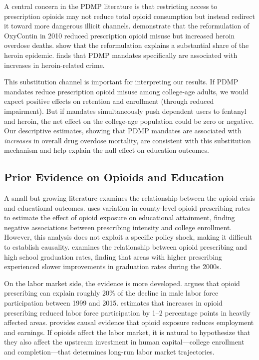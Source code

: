 \documentclass[12pt]{article}
\begin{document}
A central concern in the PDMP literature is that restricting access to prescription opioids may not reduce total opioid consumption but instead redirect it toward more dangerous illicit channels. \citet{alpert2018supply} demonstrate that the reformulation of OxyContin in 2010 reduced prescription opioid misuse but increased heroin overdose deaths. \citet{evans2019opioid} show that the reformulation explains a substantial share of the heroin epidemic. \citet{mallatt2022effect} finds that PDMP mandates specifically are associated with increases in heroin-related crime.

This substitution channel is important for interpreting our results. If PDMP mandates reduce prescription opioid misuse among college-age adults, we would expect positive effects on retention and enrollment (through reduced impairment). But if mandates simultaneously push dependent users to fentanyl and heroin, the net effect on the college-age population could be zero or negative. Our descriptive estimates, showing that PDMP mandates are associated with \textit{increases} in overall drug overdose mortality, are consistent with this substitution mechanism and help explain the null effect on education outcomes.

\subsection{Prior Evidence on Opioids and Education}

A small but growing literature examines the relationship between the opioid crisis and educational outcomes. \citet{zuo2022opioids} uses variation in county-level opioid prescribing rates to estimate the effect of opioid exposure on educational attainment, finding negative associations between prescribing intensity and college enrollment. However, this analysis does not exploit a specific policy shock, making it difficult to establish causality. \citet{deiana2019opioids} examines the relationship between opioid prescribing and high school graduation rates, finding that areas with higher prescribing experienced slower improvements in graduation rates during the 2000s.

On the labor market side, the evidence is more developed. \citet{krueger2017opioid} argues that opioid prescribing can explain roughly 20\% of the decline in male labor force participation between 1999 and 2015. \citet{kaestner2019opioid} estimates that increases in opioid prescribing reduced labor force participation by 1--2 percentage points in heavily affected areas. \citet{deshpande2024opioids} provides causal evidence that opioid exposure reduces employment and earnings. If opioids affect the labor market, it is natural to hypothesize that they also affect the upstream investment in human capital---college enrollment and completion---that determines long-run labor market trajectories.
\end{document}
